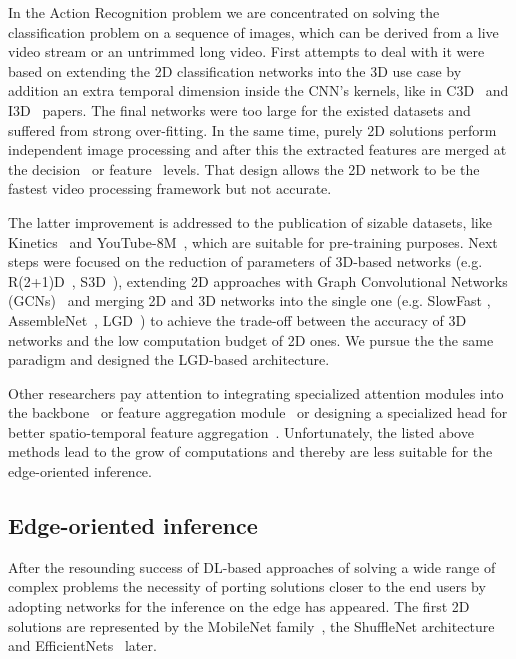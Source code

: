 \documentclass[twoside, twocolumn]{article}
\begin{document}
\lettrine[nindent=0em,lines=3]{I}{}n the Action Recognition problem we are concentrated on solving the classification
problem on a sequence of images, which can be derived from a live video stream or an untrimmed long video. First
attempts to deal with it were based on extending the 2D classification networks into the 3D use case by addition an extra
temporal dimension inside the CNN's kernels, like in C3D~\cite{C3D} and I3D~\cite{I3D} papers. The final networks were
too large for the existed datasets and suffered from strong over-fitting. In the same time, purely 2D solutions perform
independent image processing and after this the extracted features are merged at the decision~\cite{TwoStream, TSN} or
feature~\cite{TRN} levels. That design allows the 2D network to be the fastest video processing framework but not
accurate.

The latter improvement is addressed to the publication of sizable datasets, like Kinetics~\cite{Kinetics} and
YouTube-8M~\cite{Ytb8m}, which are suitable for pre-training purposes. Next steps were focused on the reduction of
parameters of 3D-based networks (e.g. R(2+1)D~\cite{R(2+1)D}, S3D~\cite{S3D}), extending 2D approaches with Graph
Convolutional Networks (GCNs)~\cite{TRG} and merging 2D and 3D networks into the single one (e.g. SlowFast
\cite{SlowFast}, AssembleNet~\cite{AssembleNet}, LGD~\cite{LGD}) to achieve the trade-off between the accuracy of 3D
networks and the low computation budget of 2D ones. We pursue the the same paradigm and designed the LGD-based
architecture.

Other researchers pay attention to integrating specialized attention modules into the backbone~\cite{RCCA} or feature
aggregation module~\cite{NL} or designing a specialized head for better spatio-temporal feature aggregation~\cite{Bert}.
Unfortunately, the listed above methods lead to the grow of computations and thereby are less suitable for the
edge-oriented inference.

\subsection{Edge-oriented inference}

\lettrine[nindent=0em,lines=3]{A}{}fter the resounding success of DL-based approaches of solving a wide range of
complex problems the necessity of porting solutions closer to the end users by adopting networks for the inference on
the edge has appeared. The first 2D solutions are represented by the MobileNet family~\cite{MN-V1, MN-V2, MN-V3}, the
ShuffleNet architecture~\cite{ShuffleNet-V1, ShuffleNet-V2} and EfficientNets~\cite{EfficientNet} later.
\end{document}
